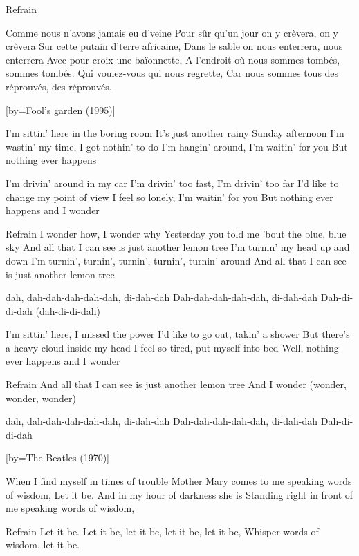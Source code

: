 \beginverse
Refrain
\endverse

\beginverse
Comme nous n'avons jamais eu d'veine
Pour sûr qu'un jour on y crèvera, on y crèvera
Sur cette putain d'terre africaine,
Dans le sable on nous enterrera, nous enterrera
Avec pour croix une baïonnette,
A l'endroit où nous sommes tombés, sommes tombés.
Qui voulez-vous qui nous regrette,
Car nous sommes tous des réprouvés, des réprouvés.
\endverse

[by={Fool's garden (1995)}]

\beginverse
I'm sittin' here in the boring room
It's just another rainy Sunday afternoon
I'm wastin' my time, I got nothin' to do
I'm hangin' around, I'm waitin' for you
But nothing ever happens
\endverse

\beginverse
I'm drivin' around in my car
I'm drivin' too fast, I'm drivin' too far
I'd like to change my point of view
I feel so lonely, I'm waitin' for you
But nothing ever happens and I wonder
\endverse

\beginverse
Refrain
I wonder how, I wonder why
Yesterday you told me 'bout the blue, blue sky
And all that I can see is just another lemon tree
I'm turnin' my head up and down
I'm turnin', turnin', turnin', turnin', turnin' around
And all that I can see is just another lemon tree
\endverse

\beginverse
dah, dah-dah-dah-dah-dah, di-dah-dah
Dah-dah-dah-dah-dah, di-dah-dah
Dah-di-di-dah (dah-di-di-dah)
\\[Bis]
\endverse

\beginverse
I'm sittin' here, I missed the power
I'd like to go out, takin' a shower
But there's a heavy cloud inside my head
I feel so tired, put myself into bed
Well, nothing ever happens and I wonder
\endverse

\beginverse
Refrain
And all that I can see is just another lemon tree
And I wonder (wonder, wonder, wonder)
\endverse

\beginverse
dah, dah-dah-dah-dah-dah, di-dah-dah
Dah-dah-dah-dah-dah, di-dah-dah
Dah-di-di-dah
\\[Bis]
\endverse

[by={The Beatles (1970)}]

\beginverse
When I find myself in times of trouble
Mother Mary comes to me speaking words of wisdom,
Let it be. And in my hour of darkness she is
Standing right in front of me speaking words of wisdom,
\endverse

\beginverse
Refrain
Let it be. Let it be, let it be, let it be, let it be,
Whisper words of wisdom, let it be.
\endverse

